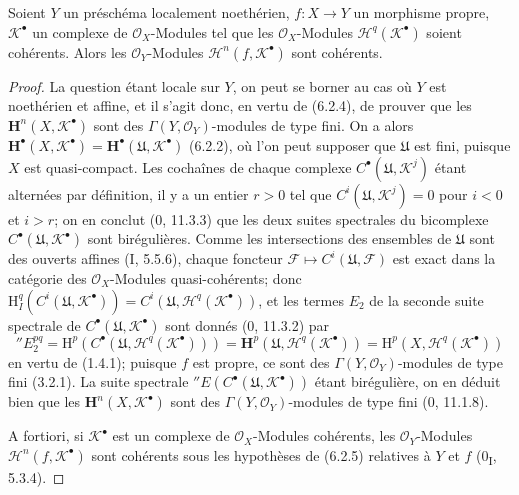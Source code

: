 \begin{proposition}[6.2.5]
Soient $Y$ un préschéma localement noethérien, $f:X\to Y$ un morphisme
propre, $\mathscr K^\bullet$ un complexe de $\mathscr O_X$-Modules tel que les
$\mathscr O_X$-Modules $\mathscr H^q(\mathscr K^\bullet)$ soient cohérents.
Alors les $\mathscr O_Y$-Modules $\mathscr H^n(f,\mathscr K^\bullet)$ sont
cohérents.
\end{proposition}

\begin{proof}
La question étant locale sur $Y$, on peut se borner au cas où $Y$ est
noethérien et affine, et il s'agit donc, en vertu de (6.2.4), de prouver que
les $\mathbf H^n(X,\mathscr K^\bullet)$ sont des
$\Gamma(Y,\mathscr O_Y)$-modules de type fini. On a alors
$\mathbf H^\bullet(X,\mathscr K^\bullet)=
\mathbf H^\bullet(\mathfrak U,\mathscr K^\bullet)$ (6.2.2), où l'on peut
supposer que $\mathfrak U$ est fini, puisque $X$ est quasi-compact. Les
cochaînes de chaque complexe $C^\bullet(\mathfrak U,\mathscr K^j)$ étant
alternées par définition, il y a un entier $r>0$ tel que
$C^i(\mathfrak U,\mathscr K^j)=0$ pour $i<0$ et $i>r$; on en conclut
(0, 11.3.3) que les deux suites spectrales du bicomplexe
$C^\bullet(\mathfrak U,\mathscr K^\bullet)$ sont birégulières. Comme les
intersections des ensembles de $\mathfrak U$ sont des ouverts affines
(I, 5.5.6), chaque foncteur
$\mathscr F\mapsto C^i(\mathfrak U,\mathscr F)$ est exact dans la catégorie
des $\mathscr O_X$-Modules quasi-cohérents; donc
$\mathrm H_I^q(C^i(\mathfrak U,\mathscr K^\bullet))
=C^i(\mathfrak U,\mathscr H^q(\mathscr K^\bullet))$, et les termes
$E_2$ de la seconde suite spectrale de
$C^\bullet(\mathfrak U,\mathscr K^\bullet)$ sont donnés (0, 11.3.2) par
\[
  ''E_2^{pq}
  =\mathrm H^p(C^\bullet(\mathfrak U,\mathscr H^q(\mathscr K^\bullet)))
  =\mathbf H^p(\mathfrak U,\mathscr H^q(\mathscr K^\bullet))
  =\mathrm H^p(X,\mathscr H^q(\mathscr K^\bullet))
\]
en vertu de (1.4.1); puisque $f$ est propre, ce sont des
$\Gamma(Y,\mathscr O_Y)$-modules de type fini (3.2.1). La suite spectrale
$''E(C^\bullet(\mathfrak U,\mathscr K^\bullet))$ étant birégulière, on en
déduit bien que les $\mathbf H^n(X,\mathscr K^\bullet)$ sont des
$\Gamma(Y,\mathscr O_Y)$-modules de type fini (0, 11.1.8).

A fortiori, si $\mathscr K^\bullet$ est un complexe de
$\mathscr O_X$-Modules cohérents, les $\mathscr O_Y$-Modules
$\mathscr H^n(f,\mathscr K^\bullet)$ sont cohérents sous les hypothèses de
(6.2.5) relatives à $Y$ et $f$ (0\textsubscript{I}, 5.3.4).
\end{proof}

